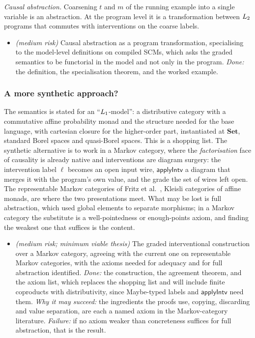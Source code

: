 \emph{Causal abstraction.} Coarsening $t$ and $m$ of the running example into a single variable is an abstraction. At the program level it is a transformation between $L_{2}$ programs that commutes with interventions on the coarse labels.
\begin{itemize}[nosep]
\item[B3] \textit{(medium risk)} Causal abstraction as a program transformation, specialising to the model-level definitions \cite{rischel2021abstraction,lorenztull2026abstraction} on compiled SCMs, which asks the graded semantics to be functorial in the model and not only in the program. \emph{Done:} the definition, the specialisation theorem, and the worked example.
\end{itemize}

\subsubsection{A more synthetic approach?}\label{sec:prop-synthetic}

The semantics is stated for an ``$L_{1}$-model'': a distributive category with a commutative affine probability monad and the structure needed for the base language, with cartesian closure for the higher-order part, instantiated at $\mathbf{Set}$, standard Borel spaces and quasi-Borel spaces. This is a shopping list. The synthetic alternative is to work in a Markov category, where the \emph{factorisation} face of causality is already native and interventions are diagram surgery: the intervention label $\ell$ becomes an open input wire, $\mathsf{applyIntv}$ a diagram that merges it with the program's own value, and the grade the set of wires left open. The representable Markov categories of Fritz et al.\ \cite{fritz2023representable}, Kleisli categories of affine monads, are where the two presentations meet. What may be lost is full abstraction, which used global elements to separate morphisms; in a Markov category the substitute is a well-pointedness or enough-points axiom, and finding the weakest one that suffices is the content.
\begin{itemize}[nosep]
\item[B4] \textit{(medium risk; minimum viable thesis)} The graded interventional construction over a Markov category, agreeing with the current one on representable Markov categories, with the axioms needed for adequacy and for full abstraction identified. \emph{Done:} the construction, the agreement theorem, and the axiom list, which replaces the shopping list and will include finite coproducts with distributivity, since Maybe-typed labels and $\mathsf{applyIntv}$ need them. \emph{Why it may succeed:} the ingredients the proofs use, copying, discarding and value separation, are each a named axiom in the Markov-category literature. \emph{Failure:} if no axiom weaker than concreteness suffices for full abstraction, that is the result.
\end{itemize}


